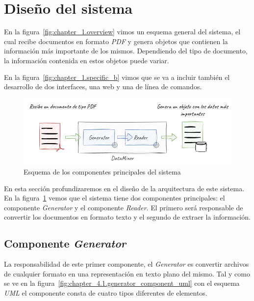 \section{Diseño del sistema}\label{sec:diseno_del_sistema}

En la figura~\ref{fig:chapter_1.overview} vimos un esquema general del sistema, el cual recibe documentos en formato
\textit{PDF} y genera objetos que contienen la información más importante de los mismos.
Dependiendo del tipo de documento, la información contenida en estos objetos puede variar.

En la figura~\ref{fig:chapter_1.specific_b} vimos que se va a incluir también el desarrollo de dos interfaces, una
web y una de línea de comandos.

\begin{figure}[ht]
    \begin{center}
        \includegraphics[width=\textwidth]{./chapter/4/images/chapter_4.1.overview}
        \caption{Esquema de los componentes principales del sistema}
        \label{fig:chapter_4.1.overview}
    \end{center}
\end{figure}

En esta sección profundizaremos en el diseño de la arquitectura de este sistema.
En la figura~\ref{fig:chapter_4.1.overview} vemos que el sistema tiene dos componentes principales: el componente
\textit{Generator} y el componente \textit{Reader}.
El primero será responsable de convertir los documentos en formato texto y el segundo de extraer la información.

\subsection*{Componente \textit{Generator}}\label{subsec:chapter_4.generator_component}

La responsabilidad de este primer componente, el \textit{Generator} es convertir archivos de cualquier formato en una
representación en texto plano del mismo.
Tal y como se ve en la figura~\ref{fig:chapter_4.1.generator_component_uml} con el esquema \textit{UML} el componente
consta de cuatro tipos diferentes de elementos.


